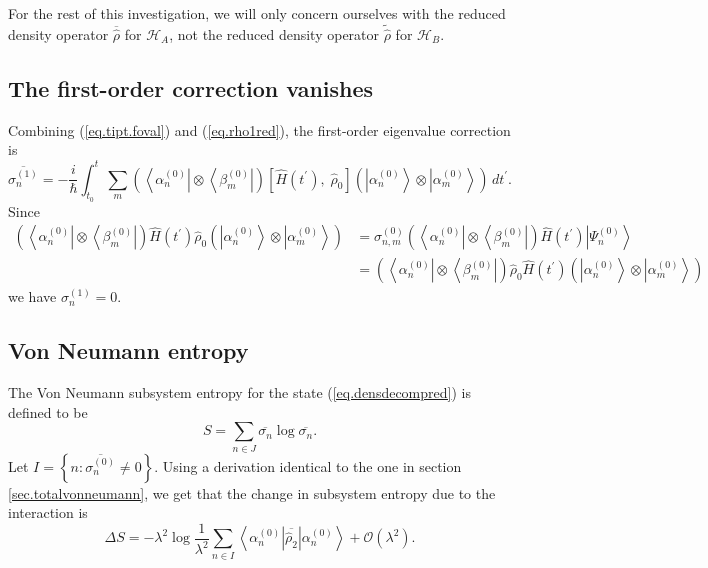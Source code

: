 \documentclass[11pt]{article}
\newcommand{\Od}[1]{\mathcal{O}{\left(#1\right)}}
\newcommand{\bra}[1]{\left\langle#1\right|}
\newcommand{\ket}[1]{\left|#1\right\rangle}
\newcommand{\hilb}{\mathcal{H}}
\newcommand{\op}[1]{\hat{#1}}
\theoremstyle{theorem}
\theoremstyle{remark}
\theoremstyle{step}
\theoremstyle{gap}
\begin{document}
For the rest of this investigation, we will only concern ourselves with the reduced density operator \(\overline{\op{\rho}}\) for \(\hilb_A\), not the reduced density operator \(\widetilde{\op{\rho}}\) for \(\hilb_B\).

\subsection{The first-order correction vanishes}

Combining (\ref{eq.tipt.foval}) and (\ref{eq.rho1red}), the first-order eigenvalue correction is
\[
\overline{\sigma_n^{(1)}} = -\frac{i}{\hbar} \int_{t_0}^t \sum_m \left(\bra{\alpha_n^{(0)}}\otimes\bra{\beta_m^{(0)}}\right) \left[\op{H}(t^\prime),\; \op{\rho}_0 \right] \left(\ket{\alpha_n^{(0)}}\otimes\ket{\alpha_m^{(0)}}\right)\,dt^\prime.
\]
Since
\begin{align*}
\left(\bra{\alpha_n^{(0)}}\otimes\bra{\beta_m^{(0)}}\right) \op{H}(t^\prime) \op{\rho}_0 \left(\ket{\alpha_n^{(0)}}\otimes\ket{\alpha_m^{(0)}}\right) 
&= 
\sigma_{n,m}^{(0)} \left(\bra{\alpha_n^{(0)}}\otimes\bra{\beta_m^{(0)}}\right) \op{H}(t^\prime) \ket{\Psi_n^{(0)}} 
\\&=
 \left(\bra{\alpha_n^{(0)}}\otimes\bra{\beta_m^{(0)}}\right) \op{\rho}_0 \op{H}(t^\prime) \left(\ket{\alpha_n^{(0)}}\otimes\ket{\alpha_m^{(0)}}\right)
\end{align*}
we have \(\sigma_n^{(1)} = 0\).


\subsection{Von Neumann entropy}

The Von Neumann subsystem entropy for the state (\ref{eq.densdecompred}) is defined to be
\[
S = \sum_{n\in J} \overline{\sigma_n} \log \overline{\sigma_n}.
\]
Let \(I = \left\{n: \overline{\sigma_n^{(0)}} \neq 0\right\}\). Using a derivation identical to the one in section \ref{sec.totalvonneumann}, we get that the change in subsystem entropy due to the interaction is
\begin{equation}\label{eq.subentropyresultwithrho2}
\boxed{\Delta S = -\lambda^2 \log\frac{1}{\lambda^2}\sum_{n \in I} \bra{{\alpha_n^{(0)}}}\overline{\op{\rho}_2}\ket{{\alpha_n^{(0)}}} + \Od{\lambda^2}.}
\end{equation}
\end{document}
